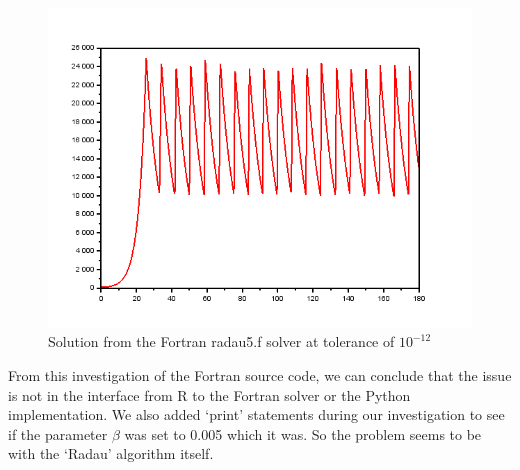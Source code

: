 \begin{figure}[h]
\centering
\includegraphics[width=0.7\linewidth]{./figures/fortran_radau_tol_12}
\caption{Solution from the Fortran radau5.f solver at tolerance of $10^{-12}$}
\label{fig:fortran_radau_tol_12}
\end{figure}

From this investigation of the Fortran source code, we can conclude that the issue is not in the interface from R to the Fortran solver or the Python implementation. We also added `print' statements during our investigation to see if the parameter $\beta$ was set to 0.005 which it was. So the problem seems to be with the `Radau' algorithm itself.
